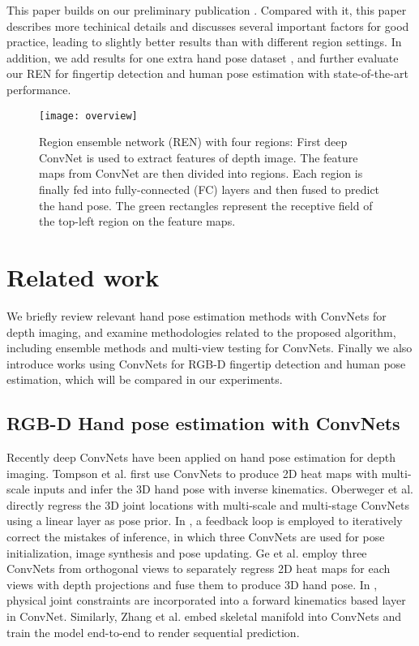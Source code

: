 \documentclass[10pt,twocolumn,letterpaper]{article}
\begin{document}
This paper builds on our preliminary publication \cite{guo2017region}. Compared with it, this paper describes more techinical details and discusses several important factors for good practice, leading to slightly better results than \cite{guo2017region} with different region settings. In addition, we add results for one extra hand pose dataset \cite{sun2015cascaded}, and further evaluate our REN for fingertip detection and human pose estimation with state-of-the-art performance.

\begin{figure}[htb]
\centering
{\texttt{[image: overview]}}
\caption{Region ensemble network (REN) with four regions: First deep ConvNet is used to extract features of depth image. The feature maps from ConvNet are then divided into regions. Each region is finally fed into fully-connected (FC) layers and then fused to predict the hand pose. The green rectangles represent the receptive field of the top-left region on the feature maps.}
\label{fig_overview}
\end{figure}

\section{Related work}
We briefly review relevant hand pose estimation methods with ConvNets for depth imaging, and examine methodologies related to the proposed algorithm, including ensemble methods and multi-view testing for ConvNets. Finally we also introduce works using ConvNets for RGB-D fingertip detection and human pose estimation, which will be compared in our experiments.

\subsection{RGB-D Hand pose estimation with ConvNets}
Recently deep ConvNets have been applied on hand pose estimation for depth imaging. Tompson et al. \cite{tompson2014real} first use ConvNets to produce 2D heat maps with multi-scale inputs and infer the 3D hand pose with inverse kinematics. Oberweger et al. \cite{oberweger2015hands} directly regress the 3D joint locations with multi-scale and multi-stage ConvNets using a linear layer as pose prior. In \cite{oberwegertraining}, a feedback loop is employed to iteratively correct the mistakes of inference, in which three ConvNets are used for pose initialization, image synthesis and pose updating. Ge et al. \cite{gerobust} employ three ConvNets from orthogonal views to separately regress 2D heat maps for each views with depth projections and fuse them to produce 3D hand pose. In \cite{zhou2016model}, physical joint constraints are incorporated into a forward kinematics based layer in ConvNet. Similarly, Zhang et al. \cite{zhang2016learning} embed skeletal manifold into ConvNets and train the model end-to-end to render sequential prediction.
\end{document}
